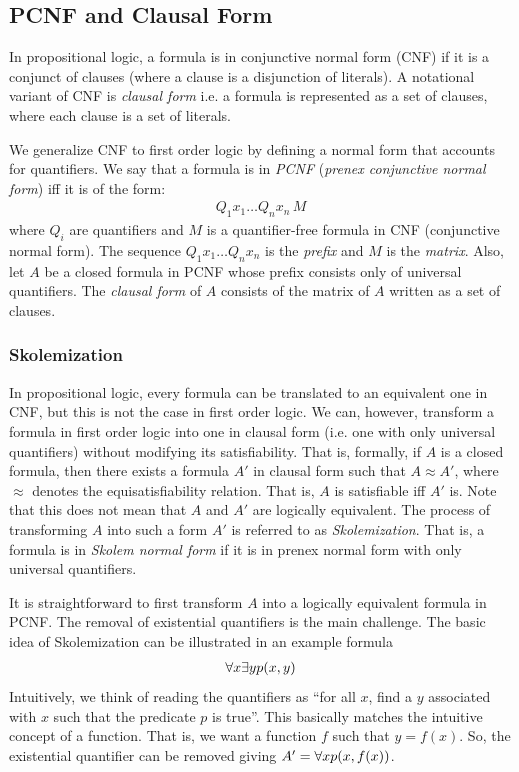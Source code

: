 \documentclass[10pt]{article}
\begin{document}
\subsection{PCNF and Clausal Form}

In propositional logic, a formula is in conjunctive normal form (CNF) if it is a conjunct of clauses (where a clause is a disjunction of literals). A notational variant of CNF is \textit{clausal form} i.e. a formula is represented as a set of clauses, where each clause is a set of literals.

We generalize CNF to first order logic by defining a normal form that accounts for quantifiers. We say that a formula is in \textit{PCNF} (\textit{prenex conjunctive normal form}) iff it is of the form:
\begin{align*}
    Q_1 x_1 \dots Q_n x_n \, M
\end{align*}
where $Q_i$ are quantifiers and $M$ is a quantifier-free formula in CNF (conjunctive normal form). The sequence $Q_1 x_1\dots Q_n x_n$ is the \textit{prefix} and $M$ is the \textit{matrix}. Also, let $A$ be a closed formula in PCNF whose prefix consists only of universal quantifiers. The \textit{clausal form} of $A$ consists of the matrix of $A$ written as a set of clauses.

\subsubsection{Skolemization}

In propositional logic, every formula can be translated to an equivalent one in CNF, but this is not the case in first order logic. We can, however, transform a formula in first order logic into one in clausal form (i.e. one with only universal quantifiers) without modifying its satisfiability. That is, formally, if $A$ is a closed formula, then there exists a formula $A'$ in clausal form such that $A \approx A'$, where $\approx$ denotes the equisatisfiability relation. That is, $A$ is satisfiable iff $A'$ is. Note that this does not mean that $A$ and $A'$ are logically equivalent. The process of transforming $A$ into such a form $A'$ is referred to as \textit{Skolemization}. That is, a formula is in \textit{Skolem normal form} if it is in prenex normal form with only universal quantifiers.

It is straightforward to first transform $A$ into a logically equivalent formula in PCNF. The removal of existential quantifiers is the main challenge. The basic idea of Skolemization can be illustrated in an example formula 
\begin{align*}
    \forall x \exists y p(x,y)
\end{align*}
Intuitively, we think of reading the quantifiers as ``for all $x$, find a $y$ associated with $x$ such that the predicate $p$ is true''. This basically matches the intuitive concept of a function. That is, we want a function $f$ such that $y=f(x)$. So, the existential quantifier can be removed giving $A' = \forall x p(x,f(x))$.
\end{document}
